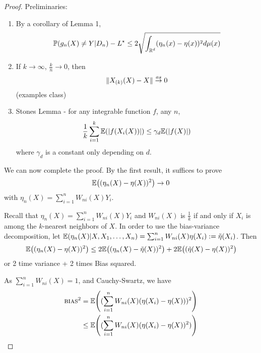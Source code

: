 \begin{proof}
  Preliminaries:
  \begin{enumerate}
  \item By a corollary of Lemma 1,
    \begin{equation}
      \label{eq:98}
      \Prob{g_{n}(X) \neq Y | D_{n}} - L^{\star}\leq 2
      \sqrt{\int_{\R^{d}} (\eta_{n}(x) - \eta(x))^{2} d \mu(x)}
    \end{equation}
  \item If $k \rightarrow \infty$, $\frac{k}{n} \rightarrow 0$, then
    \begin{equation}
      \label{eq:99}
      \| X_{(k)}(X) - X \| \overset{as}{\rightarrow} 0
    \end{equation} (examples class)
  \item Stones Lemma - for any integrable function $f$, any $n$, 
    \begin{equation}
      \label{eq:100}
      \frac{1}{k} \sum_{i=1}^{k} \E{|f(X_{i}(X))|} \leq  \gamma_{d} \E{|f(X)|}
    \end{equation} where $\gamma_{d}$ is a constant only depending on $d$.
  \end{enumerate}

  We can now complete the proof.  By the first result, it suffices to
  prove
  \begin{equation}
    \label{eq:101}
    \E{(\eta_{n}(X) - \eta(X))^{2}} \rightarrow 0
  \end{equation} with $\eta_{n}(X) = \sum_{i=1}^{n} W_{ni}(X) Y_{i}$.

  Recall that $\eta_{n}(X) = \sum_{i=1}^{n} W_{ni}(X) Y_{i}$ and
  $W_{ni}(X)$ is $\frac{1}{k}$ if and only if $X_{i}$ is among the
  $k$-nearest neighbors of $X$. In order to use the bias-variance
  decomposition, let $\E{\eta_{n}(X) | X, X_{1}, \dots, X_{n}} =
  \sum_{i=1}^{n} W_{ni}(X) \eta(X_{i}) := \tilde \eta(X_{i})$.  Then
  \begin{align}
    \label{eq:154}
    \E{(\eta_{n}(X) - \eta(X))^{2}} \leq 2 \E{(\eta_{n}(X) - \tilde
      \eta(X))^{2}} + 2 \E{(\tilde \eta(X) - \eta(X))^{2}}
  \end{align} or 2 time variance + 2 times Bias squared.

  As $\sum_{i=1}^{n} W_{ni}(X) = 1$, and Cauchy-Swartz, we have
  \begin{align}
    \label{eq:159}
    \textsc{bias}^{2} &= \E{(\sum_{i=1}^{n} W_{ni}(X)(\eta(X_{i}) -
      \eta(X)))^{2}} \\
    \label{eq:160}
    &\leq \E{(\sum_{i=1}^{n} W_{ni}(X)(\eta(X_{i}) - \eta(X))^{2})}
  \end{align}


\end{proof}

